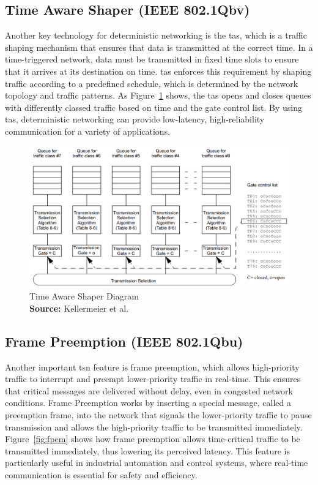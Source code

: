 \documentclass[runningheads]{llncs}
\newcommand*{\captionsource}[2]{%
  \caption[{#1}]{%
    #1%
    \\\hspace{\linewidth}%
    \textbf{Source:} #2%
  }%
}
\begin{document}
\subsection*{Time Aware Shaper (IEEE 802.1Qbv)}
Another key technology for deterministic networking is the \gls{tas}, which is a traffic shaping mechanism that ensures that data is transmitted at the correct time. In a time-triggered network, data must be transmitted in fixed time slots to ensure that it arrives at its destination on time. \gls{tas} enforces this requirement by shaping traffic according to a predefined schedule, which is determined by the network topology and traffic patterns. As Figure~\ref{fig:tas} shows, the \gls{tas} opens and closes queues with differently classed traffic based on time and the gate control list. By using \gls{tas}, deterministic networking can provide low-latency, high-reliability communication for a variety of applications.

\begin{figure}[ht]
  \centering
  \includegraphics[width=0.8\linewidth]{tas}
  \captionsource{Time Aware Shaper Diagram}{Kellermeier et al.~\cite{Kellermeier2018}}
  \label{fig:tas}
\end{figure}

\subsection*{Frame Preemption (IEEE 802.1Qbu)}
Another important \gls{tsn} feature is frame preemption, which allows high-priority traffic to interrupt and preempt lower-priority traffic in real-time. This ensures that critical messages are delivered without delay, even in congested network conditions. Frame Preemption works by inserting a special message, called a preemption frame, into the network that signals the lower-priority traffic to pause transmission and allows the high-priority traffic to be transmitted immediately. Figure~\ref{fig:fpem} shows how frame preemption allows time-critical traffic to be transmitted immediately, thus lowering its perceived latency. This feature is particularly useful in industrial automation and control systems, where real-time communication is essential for safety and efficiency.
\end{document}
